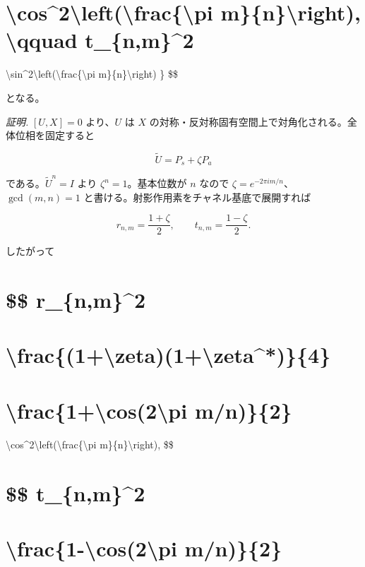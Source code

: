 \documentclass[
  a4paper,
  10pt]{article}
\begin{document}
\section{\textbackslash cos\^{}2\textbackslash left(\textbackslash frac\{\textbackslash pi
m\}\{n\}\textbackslash right), \textbackslash qquad
\textbar t\_\{n,m\}\textbar\^{}2}\label{cos2leftfracpi-mnright-qquad-t_nm2}

\textbackslash sin\^{}2\textbackslash left(\textbackslash frac\{\textbackslash pi
m\}\{n\}\textbackslash right) \} \$\$

となる。

\emph{証明.} \([U,X]=0\) より、\(U\) は \(X\)
の対称・反対称固有空間上で対角化される。全体位相を固定すると

\[
\widetilde U=P_s+\zeta P_a
\]

である。\(\widetilde U^n=I\) より \(\zeta^n=1\)。基本位数が \(n\) なので
\(\zeta=e^{-2\pi im/n}\)、\(\gcd(m,n)=1\)
と書ける。射影作用素をチャネル基底で展開すれば

\[
r_{n,m}=\frac{1+\zeta}{2},
\qquad
t_{n,m}=\frac{1-\zeta}{2}.
\]

したがって

\section{\$\$ \textbar r\_\{n,m\}\textbar\^{}2}\label{-r_nm2}

\section{\textbackslash frac\{(1+\textbackslash zeta)(1+\textbackslash zeta\^{}*)\}\{4\}}\label{frac1zeta1zeta4}

\section{\textbackslash frac\{1+\textbackslash cos(2\textbackslash pi
m/n)\}\{2\}}\label{frac1cos2pi-mn2}

\textbackslash cos\^{}2\textbackslash left(\textbackslash frac\{\textbackslash pi
m\}\{n\}\textbackslash right), \$\$

\section{\$\$ \textbar t\_\{n,m\}\textbar\^{}2}\label{-t_nm2}

\section{\textbackslash frac\{1-\textbackslash cos(2\textbackslash pi
m/n)\}\{2\}}\label{frac1-cos2pi-mn2}
\end{document}
